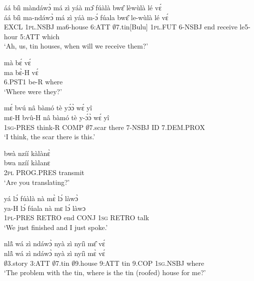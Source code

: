 \begin{exe} 
\exC\label{19}
  \glll     áá bíì màndáwɔ̀ má zì yáà mɔ̂ fúàlà bwɛ̂ lèwùlà lé vɛ́\\
          áá bíì ma-ndáwɔ̀ má zì yáà m-ɔ́ fúala bwɛ̂ le-wùlà lé vɛ́\\
              EXCL 1\textsc{pl}.NSBJ ma6-house 6:ATT $\emptyset$7.tin[Bulu] 1\textsc{pl}.FUT 6-NSBJ end receive le5-hour 5:ATT which \\
    \trans `Ah, us, tin houses, when will we receive them?'
\end{exe}

\begin{exe} 
\exC\label{20}
  \glll     mà bɛ́ vɛ́ \\ 
            ma bɛ̀-H vɛ́ \\
              6.PST1 be-R where \\
    \trans `Where were they?'
\end{exe}

\begin{exe} 
\exC\label{21}
  \glll     mɛ́ bvú nâ bàmó tè yɔ́ɔ̀ wɛ́ yî \\
          mɛ-H bvû-H nâ bàmó tè y-ɔ́ɔ̀ wɛ́ yî \\
              1\textsc{sg}-PRES think-R COMP $\emptyset$7.scar there 7-NSBJ ID 7.DEM.PROX \\
    \trans `I think, the scar there is this.'
\end{exe}


\begin{exe} 
\exC\label{22}
  \glll     bwà nzíí kàlànɛ̀ \\
            bwa nzíí kàlanɛ \\
              2\textsc{pl} PROG.PRES transmit \\
    \trans `Are you translating?'
\end{exe}

\begin{exe} 
\exC\label{23}
  \glll     yá lɔ́ fúàlà nà mɛ̀ lɔ́ làwɔ̀ \\
           ya-H lɔ́ fúala nà mɛ lɔ́ làwɔ \\
              1\textsc{pl}-PRES RETRO end CONJ 1\textsc{sg} RETRO talk \\
    \trans `We just finished and I just spoke.'
\end{exe}

\begin{exe} 
\exC\label{24}
  \glll     nlã̂ wá zì ndáwɔ̀ nyà zì nyíì mɛ̂ vɛ́ \\
          nlã̂ wá zì ndáwɔ̀ nyà zì nyíì mɛ̀ vɛ́ \\
              $\emptyset$3.story 3:ATT $\emptyset$7.tin $\emptyset$9.house 9:ATT tin 9.COP 1\textsc{sg}.NSBJ where \\
    \trans `The problem with the tin, where is the tin (roofed) house for me?'
\end{exe}

